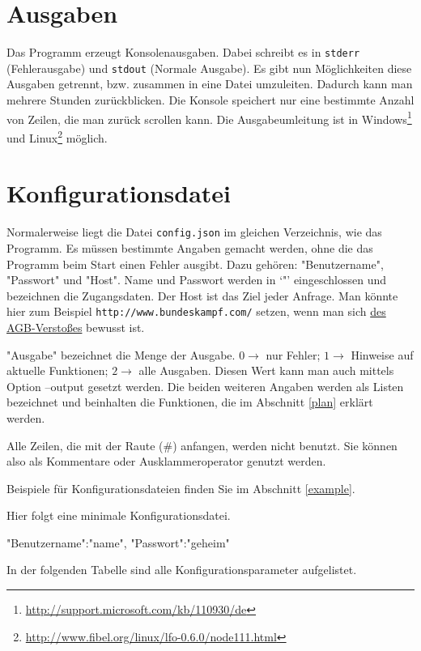 \documentclass{scrartcl}
\begin{document}
\section{Ausgaben}
Das Programm erzeugt Konsolenausgaben. Dabei schreibt es in \texttt{stderr} (Fehlerausgabe) und \texttt{stdout} (Normale Ausgabe). Es gibt nun Möglichkeiten diese Ausgaben getrennt, bzw. zusammen in eine Datei umzuleiten. Dadurch kann man mehrere Stunden zurückblicken. Die Konsole speichert nur eine bestimmte Anzahl von Zeilen, die man zurück scrollen kann. Die Ausgabeumleitung ist in Windows\footnote{\url{http://support.microsoft.com/kb/110930/de}} und Linux\footnote{\url{http://www.fibel.org/linux/lfo-0.6.0/node111.html}} möglich.


\section{Konfigurationsdatei}
Normalerweise liegt die Datei \texttt{config.json} im gleichen Verzeichnis, wie das Programm. Es müssen bestimmte Angaben gemacht werden, ohne die das Programm beim Start einen Fehler ausgibt. Dazu gehören: "Benutzername", "Passwort" und "Host". Name und Passwort werden in `"' eingeschlossen und bezeichnen die Zugangsdaten. Der Host ist das Ziel jeder Anfrage. Man könnte hier zum Beispiel \texttt{http://www.bundeskampf.com/} setzen, wenn man sich \hyperref[verboten]{des AGB-Verstoßes} bewusst ist. 

"Ausgabe" bezeichnet die Menge der Ausgabe. $0 \to$ nur Fehler; $1\to$ Hinweise auf aktuelle Funktionen; $2\to$ alle Ausgaben. Diesen Wert kann man auch mittels Option \textrm{--output} gesetzt werden. Die beiden weiteren Angaben werden als Listen bezeichnet und beinhalten die Funktionen, die im Abschnitt \ref{plan} erklärt werden.

Alle Zeilen, die mit der Raute (\#) anfangen, werden nicht benutzt. Sie können also als Kommentare oder Ausklammeroperator genutzt werden.

Beispiele für Konfigurationsdateien finden Sie im Abschnitt \ref{example}.

Hier folgt eine minimale Konfigurationsdatei.

\begin{code}[language=bash]
"Benutzername":"name",
"Passwort":"geheim"
\end{code}
   
\vspace{1cm}
In der folgenden Tabelle sind alle Konfigurationsparameter aufgelistet.
   
\end{document}

